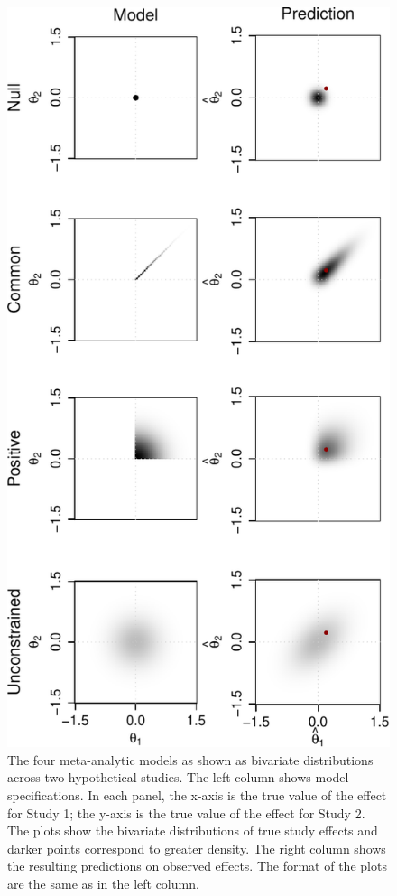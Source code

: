 \documentclass[english,man]{apa6}
\theoremstyle{definition}
\theoremstyle{definition}
\theoremstyle{remark}
\begin{document}
\begin{figure}[htbp]
\centering
\includegraphics{p_files/figure-latex/pred-1.pdf}
\caption{\label{fig:pred}The four meta-analytic models as shown as bivariate
distributions across two hypothetical studies. The left column shows
model specifications. In each panel, the x-axis is the true value of the
effect for Study 1; the y-axis is the true value of the effect for Study
2. The plots show the bivariate distributions of true study effects and
darker points correspond to greater density. The right column shows the
resulting predictions on observed effects. The format of the plots are
the same as in the left column.}
\end{figure}
\end{document}
